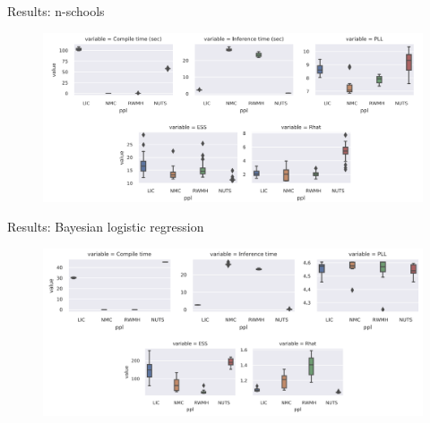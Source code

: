 \begin{frame}{Results: n-schools}
    \begin{figure}
        \centering
        \includegraphics[width=\textwidth]{Figures/lic/nschools.png}
    \end{figure}
\end{frame}

\begin{frame}{Results: Bayesian logistic regression}
    \begin{figure}
        \centering
        \includegraphics[width=\textwidth]{Figures/lic/blr.png}
    \end{figure}
\end{frame}

	
	
	

